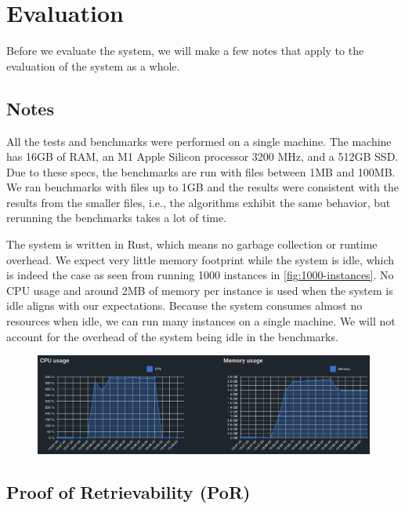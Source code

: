 \chapter{Evaluation}
\label{chapter:evaluation}

Before we evaluate the system, we will make a few notes that apply to the evaluation of the system as a whole.

\section{Notes}
\label{section:notes}

All the tests and benchmarks were performed on a single machine.
The machine has 16GB of RAM, an M1 Apple Silicon processor 3200 MHz, and a 512GB SSD.
Due to these specs, the benchmarks are run with files between 1MB and 100MB.
We ran benchmarks with files up to 1GB and the results were consistent with the results from the smaller files,
i.e., the algorithms exhibit the same behavior, but rerunning the benchmarks takes a lot of time.

The system is written in Rust, which means no garbage collection or runtime overhead.
We expect very little memory footprint while the system is idle,
which is indeed the case as seen from running 1000 instances in \autoref{fig:1000-instances}.
No CPU usage and around 2MB of memory per instance is used when the system is idle
aligns with our expectations.
Because the system consumes almost no resources when idle,
we can run many instances on a single machine.
We will not account for the overhead of the system being idle in the benchmarks.

\begin{figure}
    \centering
    \includegraphics[width=350pt]{gfx/1000-instances.png}
    \label{fig:1000-instances}
\end{figure}

\section{Proof of Retrievability (PoR)}
\label{section:por-evaluation}

